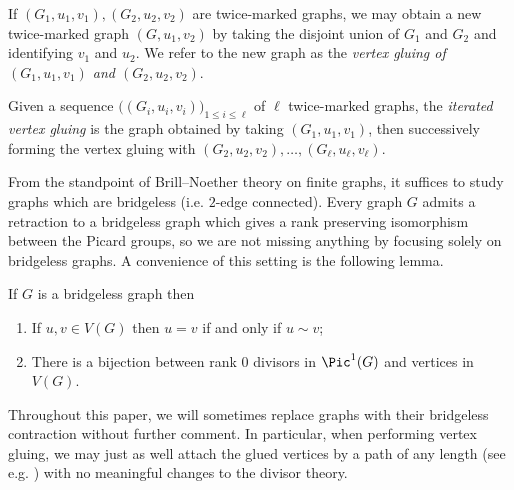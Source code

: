 \begin{defi}
    If $(G_1,u_1,v_1),(G_2,u_2,v_2)$ are twice-marked graphs, we may obtain a new twice-marked graph $(G,u_1,v_2)$ by taking the disjoint union of $G_1$ and $G_2$ and identifying $v_1$ and $u_2$. We refer to the new graph as the \textit{vertex gluing of $(G_1,u_1,v_1)$ and $(G_2,u_2,v_2)$}.
    
    Given a sequence $\Big( (G_i, u_i, v_i) \Big)_{1 \leq i \leq \ell}$ of $\ell$ twice-marked graphs, the \emph{iterated vertex gluing} is the graph obtained by taking $(G_1,u_1,v_1)$, then successively forming the vertex gluing with $(G_2, u_2, v_2), \ldots ,(G_\ell, u_\ell, v_\ell)$.
\end{defi}

From the standpoint of Brill--Noether theory on finite graphs, it suffices to study graphs which are bridgeless (i.e. $2$-edge connected). Every graph $G$ admits a retraction to a bridgeless graph which gives a rank preserving isomorphism between the Picard groups, so we are not missing anything by focusing solely on bridgeless graphs. A convenience of this setting is the following lemma.

\begin{lemma}\label{lem-bridgelessFacts}
    If $G$ is a bridgeless graph then
    \begin{enumerate}[label = \arabic*)]
        \item If $u,v \in V(G)$ then $u = v$ if and only if $u \sim v$;
        \item There is a bijection between rank $0$ divisors in $\Pic^1(G)$ and vertices in $V(G)$.
    \end{enumerate} 
\end{lemma}

Throughout this paper, we will sometimes replace graphs with their bridgeless contraction without further comment. In particular, when performing vertex gluing, we may just as well attach the glued vertices by a path of any length (see e.g. ) with no meaningful changes to the divisor theory.

